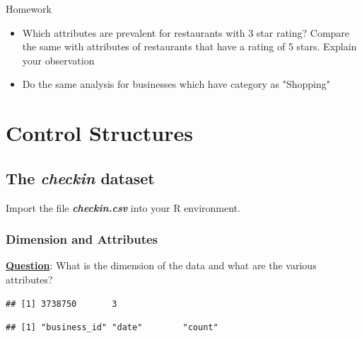 \begin{DIY}{Homework}
\noindent\begin{itemize}
  \item Which attributes are prevalent for restaurants with 3 star rating? Compare the same with attributes of restaurants that have a rating of 5 stars. Explain your observation
  \item Do the same analysis for businesses which have category as "Shopping" 
\end{itemize}
\end{DIY}





\newpage
\section{Control Structures}

\subsection{The \textbf{\emph{checkin}} dataset}
\noindent Import the file \emph{\textbf{checkin.csv}} into your R environment. 


\subsubsection{Dimension and Attributes}
\noindent \textbf{\underline{Question}}: What is the dimension of the data and what are the various attributes?
\begin{knitrout}
\color{fgcolor}\begin{kframe}
\begin{alltt}
\end{alltt}
\begin{verbatim}
## [1] 3738750       3
\end{verbatim}
\begin{alltt}
\end{alltt}
\begin{verbatim}
## [1] "business_id" "date"        "count"
\end{verbatim}
\begin{alltt}
\end{alltt}
\end{kframe}
\end{knitrout}

